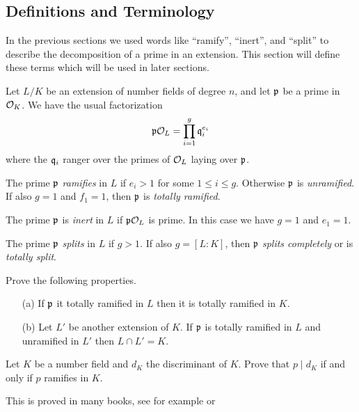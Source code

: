 \subsection{Definitions and Terminology}

In the previous sections we used words like ``ramify'',
``inert'', and ``split'' to describe the decomposition
of a prime in an extension. This section will define these
terms which will be used in later sections.

Let $L/K$ be an extension of number fields of degree $n$,
and let $\mathfrak{p}$ be a prime in $\mathcal{O}_K$. We have the usual factorization
$$
	\mathfrak{p}\mathcal{O}_L = \prod_{i=1}^g \mathfrak{q}_i^{e_i}
$$
where the $\mathfrak{q}_i$ ranger over the primes of $\mathcal{O}_L$ laying over $\mathfrak{p}$.

\begin{definition}\label{def:ramify}
	The prime $\mathfrak{p}$ \emph{ramifies} in $L$ if $e_i > 1$ for some $1\leq i\leq g$.
	Otherwise $\mathfrak{p}$ is \emph{unramified}.
	If also $g = 1$ and $f_1 = 1$, then $\mathfrak{p}$ is \emph{totally ramified}.
\end{definition}

\begin{definition}\label{def:inert}
	The prime $\mathfrak{p}$ is \emph{inert} in $L$ if $\mathfrak{p}\mathcal{O}_L$ is prime.
	In this case we have $g = 1$ and $e_1 = 1$.
\end{definition}

\begin{definition}\label{def:split}
	The prime $\mathfrak{p}$ \emph{splits} in $L$ if $g > 1$. If also $g = [L : K]$,
	then $\mathfrak{p}$ \emph{splits completely} or is \emph{totally split}.
\end{definition}

\begin{exercise}
	Prove the following properties.
	\begin{enumerate}
		\item[(a)] If $\mathfrak{p}$ it totally ramified in $L$
		then it is totally ramified in $K$.
		
		\item[(b)] Let $L'$ be another extension of $K$.
		If $\mathfrak{p}$ is totally ramified in $L$ and unramified in $L'$
		then $L\cap L' = K$.
	\end{enumerate}
\end{exercise}

\begin{exercise}
	Let $K$ be a number field and $d_K$ the discriminant of $K$.
	Prove that $p\mid d_K$ if and only if $p$ ramifies in $K$.

	\begin{hint}
		This is proved in many books, see for example
		\cite[Thm.~24]{marcus1977number} or \cite[Cor.~III.2.12]{neukirch1999}
	\end{hint}
\end{exercise}

